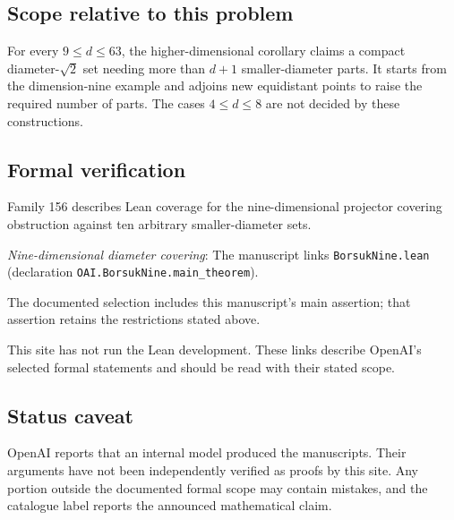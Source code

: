 \documentclass[11pt]{article}
\begin{document}
\subsection{Scope relative to this problem}
For every $9\le d\le63$, the higher-dimensional corollary claims a compact diameter-$\sqrt2$ set needing more than $d+1$ smaller-diameter parts. It starts from the dimension-nine example and adjoins new equidistant points to raise the required number of parts. The cases $4\le d\le8$ are not decided by these constructions.

\subsection{Formal verification}
Family 156 describes Lean coverage for the nine-dimensional projector covering obstruction against ten arbitrary smaller-diameter sets.

\textit{Nine-dimensional diameter covering}: The manuscript links \texttt{BorsukNine.lean} (declaration \texttt{OAI.BorsukNine.main\_theorem}).

The documented selection includes this manuscript’s main assertion; that assertion retains the restrictions stated above.

This site has not run the Lean development. These links describe OpenAI’s selected formal statements and should be read with their stated scope.

\subsection{Status caveat}
OpenAI reports that an internal model produced the manuscripts. Their arguments have not been independently verified as proofs by this site. Any portion outside the documented formal scope may contain mistakes, and the catalogue label reports the announced mathematical claim.
\end{document}
